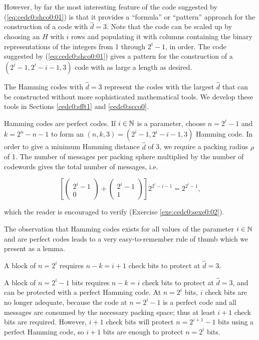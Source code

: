 However, by far the most interesting feature of the code suggested by 
(\ref{eq:cedc0:shco0:01}) is that it provides a ``formula'' or ``pattern''
approach for the construction of a code with $\hat{d}=3$.  Note that
the code can be scaled up by choosing an $H$ with $i$ rows and populating
it with columns containing the binary representations of the integers 
from 1 through $2^i - 1$, in order.  The code suggested by (\ref{eq:cedc0:shco0:01})
gives a pattern for the construction of a $(2^i - 1, 2^i - i - 1, 3)$ code 
with as large a length as desired.

The Hamming codes with $\hat{d}=3$ represent the codes with the largest $\hat{d}$ that
can be constructed without more sophisticated mathematical tools.  We
develop these tools in Sections \ref{cedc0:sfft1} and
\ref{cedc0:scco0}.

Hamming codes are perfect codes.  If $i \in {\mathbb{N}}$ is a parameter, 
choose $n=2^i - 1$ and $k = 2^n - n - 1$ to form an
$(n,k,3) = (2^i - 1, 2^i - i - 1, 3)$ Hamming code.  In order to give
a minimum Hamming distance $\hat{d}$ of 3, we require a packing radius $\rho$ of
1.  The number of messages per packing sphere multiplied by the number of codewords gives the
total number of messages, i.e.

\begin{equation}
\label{eq:cedc0:shco0:02}
\left[   \left(\begin{array}{c}2^i - 1\\0\end{array}\right) 
       + \left(\begin{array}{c}2^i - 1\\1\end{array}\right) \right]
     2^{2^i-i-1} = 2^{2^i-1},
\end{equation}

\noindent{}which the reader is encouraged to verify (Exercise \ref{exe:cedc0:sexe0:02}).

The observation that Hamming codes exists for all values of the parameter
$i \in {\mathbb{N}}$ and are perfect codes leads to a very easy-to-remember
rule of thumb which we present as a lemma.

\begin{vworklemmastatement}
\label{lem:cedc0:shco0:01}
A block of $n=2^i$ requires $n-k=i+1$ check bits to protect at $\hat{d}=3$.
\end{vworklemmastatement}
\begin{vworklemmaproof}
A block of $n=2^i-1$ bits requires $n-k=i$ check bits to protect at $\hat{d}=3$, and
can be protected with a perfect Hamming code.  At $n=2^i$ bits, $i$ check bits
are no longer adequate, because the code at $n=2^i-1$ is a perfect code and all
messages are consumed by the necessary packing space; thus at least $i+1$ check bits
are required.  However, $i+1$ check bits will protect $n=2^{i+1}-1$ bits using a
perfect Hamming code, so $i+1$ bits are enough to protect $n=2^i$ bits.
\end{vworklemmaproof}
\vworklemmafooter{}

